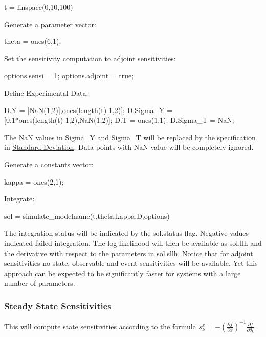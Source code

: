 \begin{DoxyCode}
t = linspace(0,10,100)
\end{DoxyCode}


Generate a parameter vector\+:


\begin{DoxyCode}
theta = ones(6,1);
\end{DoxyCode}


Set the sensitivity computation to adjoint sensitivities\+:


\begin{DoxyCode}
options.sensi = 1;
options.adjoint = \textcolor{keyword}{true};
\end{DoxyCode}


Define Experimental Data\+:


\begin{DoxyCode}
D.Y = [NaN(1,2)],ones(length(t)-1,2)];
D.Sigma\_Y = [0.1*ones(length(t)-1,2),NaN(1,2)];
D.T = ones(1,1);
D.Sigma\_T = NaN;
\end{DoxyCode}


The Na\+N values in Sigma\+\_\+\+Y and Sigma\+\_\+\+T will be replaced by the specification in \hyperlink{def_simu_std}{Standard Deviation}. Data points with Na\+N value will be completely ignored.

Generate a constants vector\+:


\begin{DoxyCode}
kappa = ones(2,1);
\end{DoxyCode}


Integrate\+:


\begin{DoxyCode}
sol = simulate\_modelname(t,theta,kappa,D,options)
\end{DoxyCode}


The integration status will be indicated by the sol.\+status flag. Negative values indicated failed integration. The log-\/likelihood will then be available as sol.\+llh and the derivative with respect to the parameters in sol.\+sllh. Notice that for adjoint sensitivities no state, observable and event sensitivities will be available. Yet this approach can be expected to be significantly faster for systems with a large number of parameters.\hypertarget{def_simu_steadystate}{}\subsubsection{Steady State Sensitivities}\label{def_simu_steadystate}
This will compute state sensitivities according to the formula $ s_k^x = -\left(\frac{\partial f}{\partial x} \right)^{-1}\frac{\partial f}{\partial \theta_k} $

